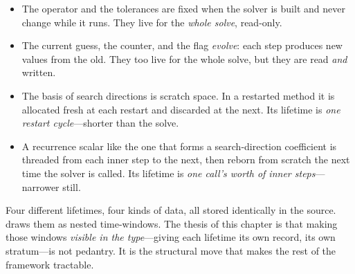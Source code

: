 \begin{itemize}[nosep]
  \item The operator and the tolerances are fixed when the solver is built and
  never change while it runs. They live for the \emph{whole solve}, read-only.
  \item The current guess, the counter, and the flag \emph{evolve}: each step
  produces new values from the old. They too live for the whole solve, but they
  are read \emph{and} written.
  \item The basis of search directions is scratch space. In a restarted method
  it is allocated fresh at each restart and discarded at the next. Its lifetime
  is \emph{one restart cycle}---shorter than the solve.
  \item A recurrence scalar like the one that forms a search-direction
  coefficient is threaded from each inner step to the next, then reborn from
  scratch the next time the solver is called. Its lifetime is \emph{one call's
  worth of inner steps}---narrower still.
\end{itemize}

Four different lifetimes, four kinds of data, all stored identically in the
source.  draws them as nested time-windows. The thesis of this
chapter is that making those windows \emph{visible in the type}---giving each
lifetime its own record, its own stratum---is not pedantry. It is the structural
move that makes the rest of the framework tractable.


